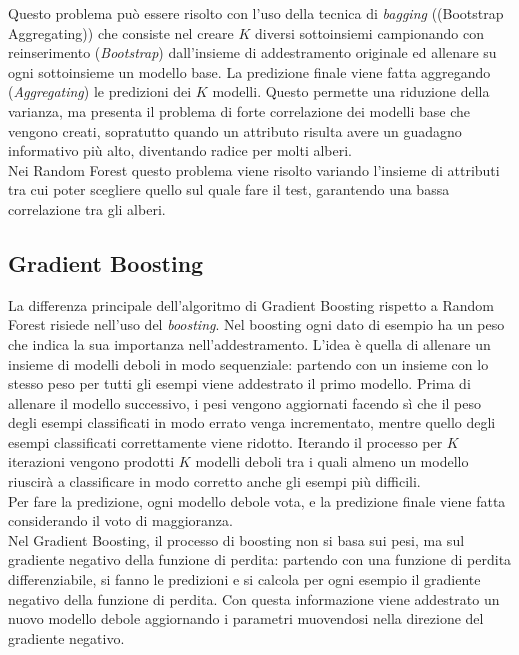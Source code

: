 Questo problema può essere risolto con l'uso della tecnica di \textit{bagging} ((Bootstrap Aggregating)) che consiste nel creare $K$ diversi sottoinsiemi campionando con reinserimento (\textit{Bootstrap}) dall'insieme di addestramento originale ed allenare su ogni sottoinsieme un modello base. La predizione finale viene fatta aggregando (\textit{Aggregating}) le predizioni dei $K$ modelli. Questo permette una riduzione della varianza, ma presenta il problema di forte correlazione dei modelli base che vengono creati, sopratutto quando un attributo risulta avere un guadagno informativo più alto, diventando radice per molti alberi.\\
Nei Random Forest questo problema viene risolto variando  l'insieme di attributi tra cui poter scegliere quello sul quale fare il test, garantendo una bassa correlazione tra gli alberi.
\subsection{Gradient Boosting}
La differenza principale dell'algoritmo di Gradient Boosting rispetto a Random Forest risiede nell'uso del \textit{boosting}.
Nel boosting ogni dato di esempio ha un peso che indica la sua importanza nell'addestramento. L'idea è quella di allenare un insieme di modelli deboli in modo sequenziale: partendo con un insieme con lo stesso peso per tutti gli esempi viene addestrato il primo modello. Prima di allenare il modello successivo, i pesi vengono aggiornati facendo sì che il peso degli esempi classificati in modo errato venga incrementato, mentre quello degli esempi classificati correttamente viene ridotto. Iterando il processo per $K$ iterazioni vengono prodotti $K$ modelli deboli tra i quali almeno un modello riuscirà a classificare in modo corretto anche gli esempi più difficili.\\
Per fare la predizione, ogni modello debole vota, e la predizione finale viene fatta considerando il voto di maggioranza.\\
Nel Gradient Boosting, il processo di boosting non si basa sui pesi, ma sul gradiente negativo della funzione di perdita: partendo con una funzione di perdita differenziabile, si fanno le predizioni e si calcola per ogni esempio il gradiente negativo della funzione di perdita. Con questa informazione viene addestrato un nuovo modello debole aggiornando i parametri muovendosi nella direzione del gradiente negativo. 
